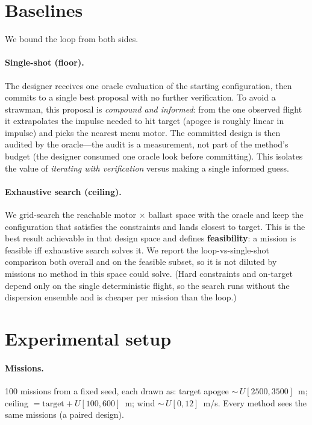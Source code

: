 \documentclass[11pt]{article}
\begin{document}
\section{Baselines}

We bound the loop from both sides.

\paragraph{Single-shot (floor).} The designer receives one oracle evaluation of
the starting configuration, then commits to a single best proposal with no
further verification. To avoid a strawman, this proposal is \emph{compound and
informed}: from the one observed flight it extrapolates the impulse needed to hit
target (apogee is roughly linear in impulse) and picks the nearest menu motor.
The committed design is then audited by the oracle---the audit is a measurement,
not part of the method's budget (the designer consumed one oracle look before
committing). This isolates the value of \emph{iterating with verification} versus
making a single informed guess.

\paragraph{Exhaustive search (ceiling).} We grid-search the reachable
motor $\times$ ballast space with the oracle and keep the configuration that
satisfies the constraints and lands closest to target. This is the best result
achievable in that design space and defines \textbf{feasibility}: a mission is
feasible iff exhaustive search solves it. We report the loop-vs-single-shot
comparison both overall and on the feasible subset, so it is not diluted by
missions no method in this space could solve. (Hard constraints and on-target
depend only on the single deterministic flight, so the search runs without the
dispersion ensemble and is cheaper per mission than the loop.)

\section{Experimental setup}

\paragraph{Missions.} 100 missions from a fixed seed, each drawn as: target
apogee ${\sim}\,U[2500, 3500]$~m; ceiling $= \text{target} + U[100, 600]$~m; wind
${\sim}\,U[0, 12]$~m/s. Every method sees the same missions (a paired design).
\end{document}
